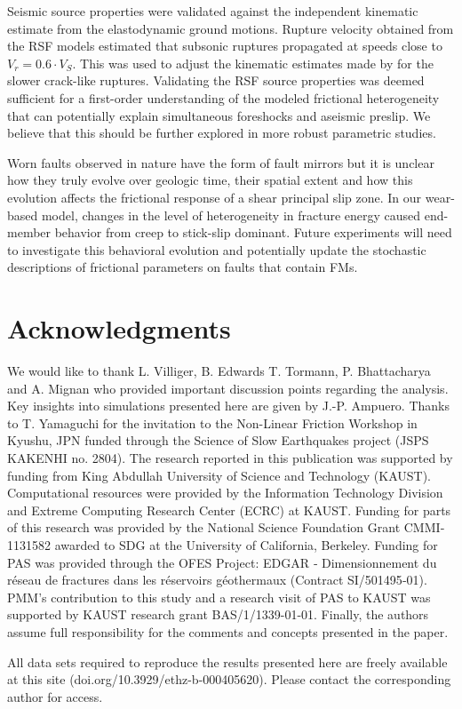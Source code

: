 \documentclass[preprint,1p, 10pt,authoryear]{elsarticle}
\begin{document}
Seismic source properties were validated against the independent kinematic estimate from the elastodynamic ground motions.  Rupture velocity obtained from the RSF models estimated that subsonic ruptures propagated at speeds close to $V_r = 0.6\cdot V_{S}$.  This was used to adjust the kinematic estimates made by \citet{Selvadurai2019} for the slower crack-like ruptures. Validating the RSF source properties was deemed sufficient for a first-order understanding of the modeled frictional heterogeneity that can potentially explain simultaneous foreshocks and aseismic preslip. We believe that this should be further explored in more robust parametric studies. 

Worn faults observed in nature have the form of fault mirrors but it is unclear how they truly evolve over geologic time, their spatial extent and how this evolution affects the frictional response of a shear principal slip zone. In our wear-based model, changes in the level of heterogeneity in fracture energy caused end-member behavior from creep to stick-slip dominant. Future experiments will need to investigate this behavioral evolution and potentially update the stochastic descriptions of frictional parameters on faults that contain FMs. 

\section*{Acknowledgments}
We would like to thank L. Villiger, B. Edwards T. Tormann, P. Bhattacharya and A. Mignan who provided important discussion points regarding the analysis. Key insights into simulations presented here are given by J.-P. Ampuero. Thanks to T. Yamaguchi for the invitation to the Non-Linear Friction Workshop in Kyushu, JPN funded through the Science of Slow Earthquakes project (JSPS KAKENHI no. 2804). The research reported in this publication was supported by funding from King Abdullah University of Science and Technology (KAUST). Computational resources were provided by the Information Technology Division and Extreme Computing Research Center (ECRC) at KAUST. Funding for parts of this research was provided by the National Science Foundation Grant CMMI‐1131582 awarded to SDG at the University of California, Berkeley. Funding for PAS was provided through the OFES Project: EDGAR ‐ Dimensionnement du réseau de fractures dans les réservoirs géothermaux (Contract SI/501495‐01). PMM's contribution to this study and a research visit of PAS to KAUST was supported by KAUST research grant BAS/1/1339-01-01. Finally, the authors assume full responsibility for the comments and concepts presented in the paper.

All data sets required to reproduce the results presented here are freely available at this site (doi.org/10.3929/ethz-b-000405620). Please contact the corresponding author for access.

\singlespacing

 

\end{document}
